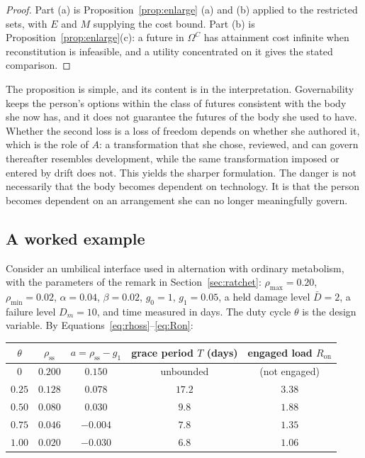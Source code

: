 \documentclass[11pt]{article}
\theoremstyle{plain}
\theoremstyle{definition}
\theoremstyle{remark}
\begin{document}
\begin{proof}
Part (a) is Proposition~\ref{prop:enlarge} (a) and (b) applied to the restricted sets, with $E$ and $M$ supplying the cost bound. Part (b) is Proposition~\ref{prop:enlarge}(c): a future in $\Omega^C$ has attainment cost infinite when reconstitution is infeasible, and a utility concentrated on it gives the stated comparison.
\end{proof}

The proposition is simple, and its content is in the interpretation. Governability keeps the person's options within the class of futures consistent with the body she now has, and it does not guarantee the futures of the body she used to have. Whether the second loss is a loss of freedom depends on whether she authored it, which is the role of $A$: a transformation that she chose, reviewed, and can govern thereafter resembles development, while the same transformation imposed or entered by drift does not. This yields the sharper formulation. The danger is not necessarily that the body becomes dependent on technology. It is that the person becomes dependent on an arrangement she can no longer meaningfully govern.

\subsection{A worked example}

Consider an umbilical interface used in alternation with ordinary metabolism, with the parameters of the remark in Section~\ref{sec:ratchet}: $\rho_{\max}=0.20$, $\rho_{\min}=0.02$, $\alpha=0.04$, $\beta=0.02$, $g_0=1$, $g_1=0.05$, a held damage level $\bar D=2$, a failure level $D_m=10$, and time measured in days. The duty cycle $\theta$ is the design variable. By Equations~\eqref{eq:rhoss}--\eqref{eq:Ron}:

\begin{center}
\begin{tabular}{ccccc}
\toprule
$\theta$ & $\rho_{\mathrm{ss}}$ & $a=\rho_{\mathrm{ss}}-g_1$ & grace period $T$ (days) & engaged load $R_{\mathrm{on}}$\\
\midrule
$0$ & $0.200$ & $0.150$ & unbounded & (not engaged)\\
$0.25$ & $0.128$ & $0.078$ & $17.2$ & $3.38$\\
$0.50$ & $0.080$ & $0.030$ & $9.8$ & $1.88$\\
$0.75$ & $0.046$ & $-0.004$ & $7.8$ & $1.35$\\
$1.00$ & $0.020$ & $-0.030$ & $6.8$ & $1.06$\\
\bottomrule
\end{tabular}
\end{center}
\end{document}
